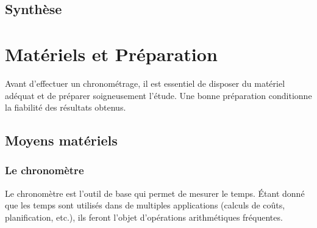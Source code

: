\documentclass[a4paper,12pt]{article}
\begin{document}
\subsection{Synthèse}

\begin{center}
\end{center}


\section{Matériels et Préparation}

Avant d'effectuer un chronométrage, il est essentiel de disposer du matériel adéquat et de préparer soigneusement l'étude. Une bonne préparation conditionne la fiabilité des résultats obtenus.

\subsection{Moyens matériels}

\subsubsection{Le chronomètre}

Le chronomètre est l'outil de base qui permet de mesurer le temps. Étant donné que les temps sont utilisés dans de multiples applications (calculs de coûts, planification, etc.), ils feront l'objet d'opérations arithmétiques fréquentes.
\end{document}
